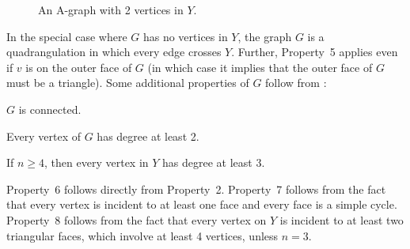 \begin{figure}
		\caption{An A-graph with 2 vertices in $Y$.}
\end{figure}
	
In the special case where $G$ has no vertices in $Y$, the graph $G$ is a quadrangulation in which every edge crosses $Y$. Further, Property~5 applies even if $v$ is on the outer face of $G$ (in which case it implies that the outer face of $G$ must be a triangle).
Some additional properties of $G$ follow from :
\begin{compactenum}\setcounter{enumi}{5}
	\item $G$ is connected.
	\item Every vertex of $G$ has degree at least 2.   
	\item If $n\ge 4$, then every vertex in $Y$ has degree at least 3. 
\end{compactenum}
Property~6 follows directly from Property~2.
Property~7 follows from the fact that every vertex is incident to at
least one face and every face is a simple cycle.
Property~8 follows from the fact that every vertex on $Y$ is incident
to at least two triangular faces, which involve at least 4 vertices, unless $n=3$.

